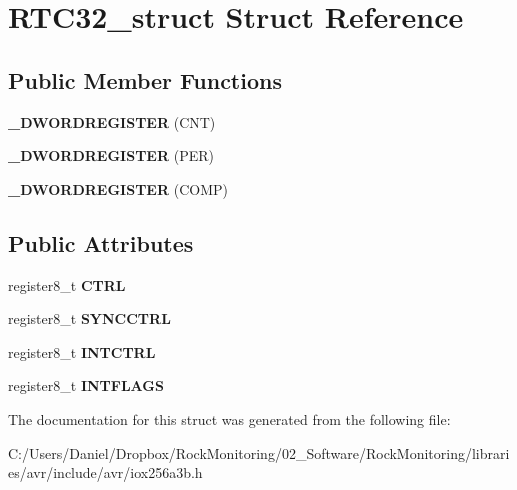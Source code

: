 \hypertarget{struct_r_t_c32__struct}{}\section{R\+T\+C32\+\_\+struct Struct Reference}
\label{struct_r_t_c32__struct}
\subsection*{Public Member Functions}
\begin{DoxyCompactItemize}
\item 
{\bfseries \+\_\+\+D\+W\+O\+R\+D\+R\+E\+G\+I\+S\+T\+ER} (C\+NT)\hypertarget{struct_r_t_c32__struct_a1d7b132de2c2917d9ca69c6c78ec7398}{}\label{struct_r_t_c32__struct_a1d7b132de2c2917d9ca69c6c78ec7398}

\item 
{\bfseries \+\_\+\+D\+W\+O\+R\+D\+R\+E\+G\+I\+S\+T\+ER} (P\+ER)\hypertarget{struct_r_t_c32__struct_aca1bf2c27d16e1fb3568cc30093fc072}{}\label{struct_r_t_c32__struct_aca1bf2c27d16e1fb3568cc30093fc072}

\item 
{\bfseries \+\_\+\+D\+W\+O\+R\+D\+R\+E\+G\+I\+S\+T\+ER} (C\+O\+MP)\hypertarget{struct_r_t_c32__struct_a85d995fa6d39b9e3e4bc186666d4f20b}{}\label{struct_r_t_c32__struct_a85d995fa6d39b9e3e4bc186666d4f20b}

\end{DoxyCompactItemize}
\subsection*{Public Attributes}
\begin{DoxyCompactItemize}
\item 
register8\+\_\+t {\bfseries C\+T\+RL}\hypertarget{struct_r_t_c32__struct_a4600a08ba8718c9294f29356a67bc56b}{}\label{struct_r_t_c32__struct_a4600a08ba8718c9294f29356a67bc56b}

\item 
register8\+\_\+t {\bfseries S\+Y\+N\+C\+C\+T\+RL}\hypertarget{struct_r_t_c32__struct_a2107424556aa99c7505026073f9acd10}{}\label{struct_r_t_c32__struct_a2107424556aa99c7505026073f9acd10}

\item 
register8\+\_\+t {\bfseries I\+N\+T\+C\+T\+RL}\hypertarget{struct_r_t_c32__struct_af4d79cc592d3203e288f14fa68499d94}{}\label{struct_r_t_c32__struct_af4d79cc592d3203e288f14fa68499d94}

\item 
register8\+\_\+t {\bfseries I\+N\+T\+F\+L\+A\+GS}\hypertarget{struct_r_t_c32__struct_a886c2d218096479f94ef6be534d57140}{}\label{struct_r_t_c32__struct_a886c2d218096479f94ef6be534d57140}

\end{DoxyCompactItemize}


The documentation for this struct was generated from the following file\+:\begin{DoxyCompactItemize}
\item 
C\+:/\+Users/\+Daniel/\+Dropbox/\+Rock\+Monitoring/02\+\_\+\+Software/\+Rock\+Monitoring/libraries/avr/include/avr/iox256a3b.\+h\end{DoxyCompactItemize}
